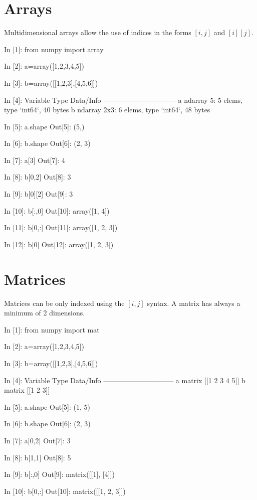 \section{Arrays}
Multidimensional arrays allow the use of indices in the forms $[i,j]$ and 
$[i][j]$.

\begin{code}
In [1]: from numpy import array

In [2]: a=array([1,2,3,4,5])

In [3]: b=array([[1,2,3],[4,5,6]])

In [4]: %
Variable   Type       Data/Info
-------------------------------
a          ndarray    5: 5 elems, type `int64`, 40 bytes
b          ndarray    2x3: 6 elems, type `int64`, 48 bytes
\end{code}

\begin{code}
In [5]: a.shape
Out[5]: (5,)

In [6]: b.shape
Out[6]: (2, 3)

In [7]: a[3]
Out[7]: 4

In [8]: b[0,2]
Out[8]: 3

In [9]: b[0][2]
Out[9]: 3

In [10]: b[:,0]
Out[10]: array([1, 4])

In [11]: b[0,:]
Out[11]: array([1, 2, 3])

In [12]: b[0]
Out[12]: array([1, 2, 3])
\end{code}

\section{Matrices}
Matrices can be only indexed using the $[i,j]$ syntax. A matrix has always a 
minimum of 2 dimensions.

\begin{code}
In [1]: from numpy import mat

In [2]: a=array([1,2,3,4,5])

In [3]: b=array([[1,2,3],[4,5,6]])

In [4]: %
Variable   Type      Data/Info
------------------------------
a          matrix    [[1 2 3 4 5]]
b          matrix    [[1 2 3]\n [4 5 6]]

In [5]: a.shape
Out[5]: (1, 5)

In [6]: b.shape
Out[6]: (2, 3)
\end{code}

\begin{code}
In [7]: a[0,2]
Out[7]: 3

In [8]: b[1,1]
Out[8]: 5

In [9]: b[:,0]
Out[9]: 
matrix([[1],
        [4]])

In [10]: b[0,:]
Out[10]: matrix([[1, 2, 3]])
\end{code}

